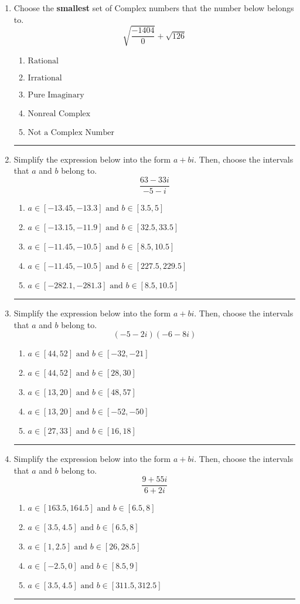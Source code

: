 \documentclass[14pt]{extbook}
\newcommand{\litem}[1]{\item#1\hspace*{-1cm}\rule{\textwidth}{0.4pt}}
\begin{document}
\begin{enumerate}
\litem{
Choose the \textbf{smallest} set of Complex numbers that the number below belongs to.\[ \sqrt{\frac{-1404}{0}}+\sqrt{126} \]\begin{enumerate}[label=\Alph*.]
\item \( \text{Rational} \)
\item \( \text{Irrational} \)
\item \( \text{Pure Imaginary} \)
\item \( \text{Nonreal Complex} \)
\item \( \text{Not a Complex Number} \)

\end{enumerate} }
\litem{
Simplify the expression below into the form $a+bi$. Then, choose the intervals that $a$ and $b$ belong to.\[ \frac{63 - 33 i}{-5 - i} \]\begin{enumerate}[label=\Alph*.]
\item \( a \in [-13.45, -13.3] \text{ and } b \in [3.5, 5] \)
\item \( a \in [-13.15, -11.9] \text{ and } b \in [32.5, 33.5] \)
\item \( a \in [-11.45, -10.5] \text{ and } b \in [8.5, 10.5] \)
\item \( a \in [-11.45, -10.5] \text{ and } b \in [227.5, 229.5] \)
\item \( a \in [-282.1, -281.3] \text{ and } b \in [8.5, 10.5] \)

\end{enumerate} }
\litem{
Simplify the expression below into the form $a+bi$. Then, choose the intervals that $a$ and $b$ belong to.\[ (-5 - 2 i)(-6 - 8 i) \]\begin{enumerate}[label=\Alph*.]
\item \( a \in [44, 52] \text{ and } b \in [-32, -21] \)
\item \( a \in [44, 52] \text{ and } b \in [28, 30] \)
\item \( a \in [13, 20] \text{ and } b \in [48, 57] \)
\item \( a \in [13, 20] \text{ and } b \in [-52, -50] \)
\item \( a \in [27, 33] \text{ and } b \in [16, 18] \)

\end{enumerate} }
\litem{
Simplify the expression below into the form $a+bi$. Then, choose the intervals that $a$ and $b$ belong to.\[ \frac{9 + 55 i}{6 + 2 i} \]\begin{enumerate}[label=\Alph*.]
\item \( a \in [163.5, 164.5] \text{ and } b \in [6.5, 8] \)
\item \( a \in [3.5, 4.5] \text{ and } b \in [6.5, 8] \)
\item \( a \in [1, 2.5] \text{ and } b \in [26, 28.5] \)
\item \( a \in [-2.5, 0] \text{ and } b \in [8.5, 9] \)
\item \( a \in [3.5, 4.5] \text{ and } b \in [311.5, 312.5] \)


\end{enumerate}}
\end{enumerate}
\end{document}
